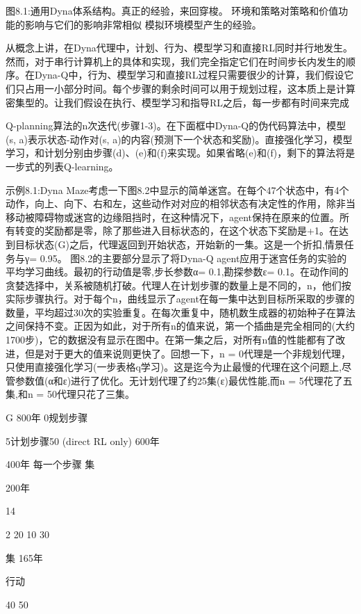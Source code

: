 图8.1:通用Dyna体系结构。真正的经验，来回穿梭。
环境和策略对策略和价值功能的影响与它们的影响非常相似
模拟环境模型产生的经验。

从概念上讲，在Dyna代理中，计划、行为、模型学习和直接RL同时并行地发生。然而，对于串行计算机上的具体和实现，我们完全指定它们在时间步长内发生的顺序。在Dyna-Q中，行为、模型学习和直接RL过程只需要很少的计算，我们假设它们只占用一小部分时间。每个步骤的剩余时间可以用于规划过程，这本质上是计算密集型的。让我们假设在执行、模型学习和指导RL之后，每一步都有时间来完成

Q-planning算法的n次迭代(步骤1-3)。在下面框中Dyna-Q的伪代码算法中，模型(s, a)表示状态-动作对(s, a)的内容(预测下一个状态和奖励)。直接强化学习，模型学习，和计划分别由步骤(d)、(e)和(f)来实现。如果省略(e)和(f)，剩下的算法将是一步式的列表Q-learning。

示例8.1:Dyna Maze考虑一下图8.2中显示的简单迷宫。在每个47个状态中，有4个动作，向上、向下、右和左，这些动作对对应的相邻状态有决定性的作用，除非当移动被障碍物或迷宫的边缘阻挡时，在这种情况下，agent保持在原来的位置。所有转变的奖励都是零，除了那些进入目标状态的，在这个状态下奖励是+1。在达到目标状态(G)之后，代理返回到开始状态，开始新的一集。这是一个折扣,情景任务与γ= 0.95。
图8.2的主要部分显示了将Dyna-Q agent应用于迷宫任务的实验的平均学习曲线。最初的行动值是零,步长参数α= 0.1,勘探参数ε= 0.1。在动作间的贪婪选择中，关系被随机打破。代理人在计划步骤的数量上是不同的，n，他们按实际步骤执行。对于每个n，曲线显示了agent在每一集中达到目标所采取的步骤的数量，平均超过30次的实验重复。在每次重复中，随机数生成器的初始种子在算法之间保持不变。正因为如此，对于所有n的值来说，第一个插曲是完全相同的(大约1700步)，它的数据没有显示在图中。在第一集之后，对所有n值的性能都有了改进，但是对于更大的值来说则更快了。回想一下，n = 0代理是一个非规划代理，只使用直接强化学习(一步表格q学习)。这是迄今为止最慢的代理在这个问题上,尽管参数值(α和ε)进行了优化。无计划代理了约25集(ε)最优性能,而n = 5代理花了五集,和n = 50代理只花了三集。

		G
800年		
	0规划步骤


5计划步骤50	
	(direct RL only)	
600年




400年
每一个步骤
集


200年




14

2 20 10 30


集
165年
 

行动




40 50


